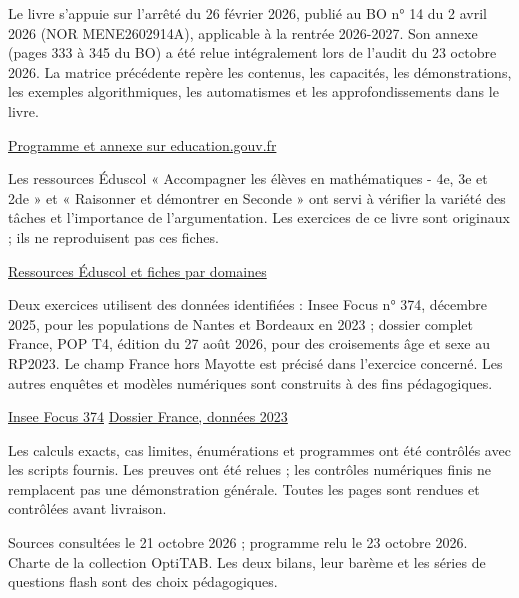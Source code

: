 \thispagestyle{otFront}\gdef{}\label{references}
Le livre s’appuie sur l’arrêté du 26 février 2026, publié au BO n° 14 du 2 avril 2026 (NOR MENE2602914A), applicable à la rentrée 2026-2027. Son annexe (pages 333 à 345 du BO) a été relue intégralement lors de l’audit du 23 octobre 2026. La matrice précédente repère les contenus, les capacités, les démonstrations, les exemples algorithmiques, les automatismes et les approfondissements dans le livre.\par\smallskip
\href{https://www.education.gouv.fr/bo/2026/Hebdo14/MENE2602914A}{Programme et annexe sur education.gouv.fr}\par\bigskip
{}
Les ressources Éduscol « Accompagner les élèves en mathématiques - 4e, 3e et 2de » et « Raisonner et démontrer en Seconde » ont servi à vérifier la variété des tâches et l’importance de l’argumentation. Les exercices de ce livre sont originaux ; ils ne reproduisent pas ces fiches.\par\smallskip
\href{https://eduscol.education.gouv.fr/6858/accompagner-les-eleves-en-mathematiques-4e-3e-et-2de}{Ressources Éduscol et fiches par domaines}\par\bigskip
{}
Deux exercices utilisent des données identifiées : Insee Focus n° 374, décembre 2025, pour les populations de Nantes et Bordeaux en 2023 ; dossier complet France, POP T4, édition du 27 août 2026, pour des croisements âge et sexe au RP2023. Le champ France hors Mayotte est précisé dans l’exercice concerné. Les autres enquêtes et modèles numériques sont construits à des fins pédagogiques.\par\smallskip
\href{https://www.insee.fr/fr/statistiques/8682718}{Insee Focus 374}\quad
\href{https://www.insee.fr/fr/statistiques/2011101?geo=FRANCE-1}{Dossier France, données 2023}\par\bigskip
{}
Les calculs exacts, cas limites, énumérations et programmes ont été contrôlés avec les scripts fournis. Les preuves ont été relues ; les contrôles numériques finis ne remplacent pas une démonstration générale. Toutes les pages sont rendues et contrôlées avant livraison.\par\medskip
{\small\color{otMuted}Sources consultées le 21 octobre 2026 ; programme relu le 23 octobre 2026. Charte de la collection OptiTAB. Les deux bilans, leur barème et les séries de questions flash sont des choix pédagogiques.}\clearpage